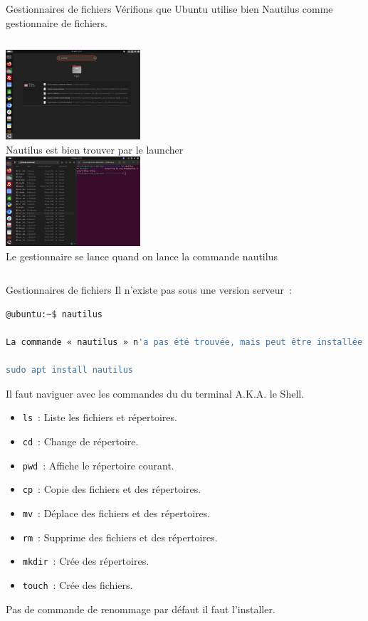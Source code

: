 \documentclass{beamer}
\begin{document}
    \begin{frame}{Gestionnaires de fichiers}
        Vérifions que Ubuntu utilise bien Nautilus comme gestionnaire de fichiers.
        \bigbreak
        \begin{columns}
            \centering
            \includegraphics[width=5cm]{image/nautilus-gui} \\ Nautilus est bien trouver par le launcher \\
            \centering
            \includegraphics[width=5cm]{image/nautilus-cli} \\ Le gestionnaire se lance quand on lance la commande nautilus \\
        \end{columns}
    \end{frame}

    \begin{frame}[fragile]{Gestionnaires de fichiers}
        Il n'existe pas sous une version serveur~:
        \begin{lstlisting}[language=bash]
@ubuntu:~$ nautilus

La commande « nautilus » n'a pas été trouvée, mais peut être installée avec~:

sudo apt install nautilus
        \end{lstlisting}
        Il faut naviguer avec les commandes du du terminal A.K.A. le Shell.
        \begin{itemize}
            \item \lstinline{ls}~: Liste les fichiers et répertoires.
            \item \lstinline{cd}~: Change de répertoire.
            \item \lstinline{pwd}~: Affiche le répertoire courant.
            \item \lstinline{cp}~: Copie des fichiers et des répertoires.
            \item \lstinline{mv}~: Déplace des fichiers et des répertoires.
            \item \lstinline{rm}~: Supprime des fichiers et des répertoires.
            \item \lstinline{mkdir}~: Crée des répertoires.
            \item \lstinline{touch}~: Crée des fichiers.
        \end{itemize}
        Pas de commande de renommage par défaut il faut l'installer.
    \end{frame}
\end{document}

